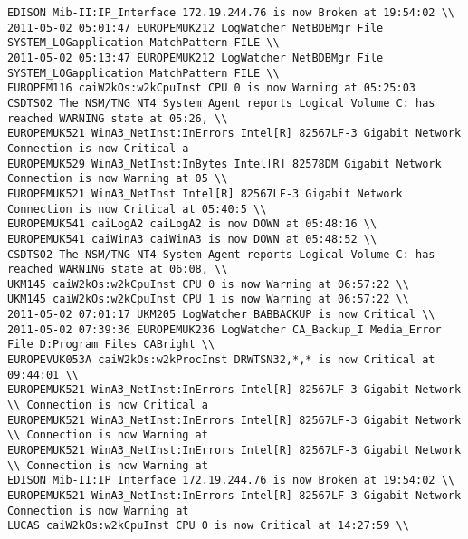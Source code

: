 \begin{lstlisting}
EDISON Mib-II:IP_Interface 172.19.244.76 is now Broken at 19:54:02 \\
2011-05-02 05:01:47 EUROPEMUK212 LogWatcher NetBDBMgr File SYSTEM_LOGapplication MatchPattern FILE \\
2011-05-02 05:13:47 EUROPEMUK212 LogWatcher NetBDBMgr File SYSTEM_LOGapplication MatchPattern FILE \\
EUROPEM116 caiW2kOs:w2kCpuInst CPU 0 is now Warning at 05:25:03
CSDTS02 The NSM/TNG NT4 System Agent reports Logical Volume C: has reached WARNING state at 05:26, \\
EUROPEMUK521 WinA3_NetInst:InErrors Intel[R] 82567LF-3 Gigabit Network Connection is now Critical a
EUROPEMUK529 WinA3_NetInst:InBytes Intel[R] 82578DM Gigabit Network Connection is now Warning at 05 \\
EUROPEMUK521 WinA3_NetInst Intel[R] 82567LF-3 Gigabit Network Connection is now Critical at 05:40:5 \\
EUROPEMUK541 caiLogA2 caiLogA2 is now DOWN at 05:48:16 \\
EUROPEMUK541 caiWinA3 caiWinA3 is now DOWN at 05:48:52 \\
CSDTS02 The NSM/TNG NT4 System Agent reports Logical Volume C: has reached WARNING state at 06:08, \\
UKM145 caiW2kOs:w2kCpuInst CPU 0 is now Warning at 06:57:22 \\
UKM145 caiW2kOs:w2kCpuInst CPU 1 is now Warning at 06:57:22 \\
2011-05-02 07:01:17 UKM205 LogWatcher BABBACKUP is now Critical \\
2011-05-02 07:39:36 EUROPEMUK236 LogWatcher CA_Backup_I Media_Error File D:Program Files CABright \\
EUROPEVUK053A caiW2kOs:w2kProcInst DRWTSN32,*,* is now Critical at 09:44:01 \\
EUROPEMUK521 WinA3_NetInst:InErrors Intel[R] 82567LF-3 Gigabit Network \\ Connection is now Critical a
EUROPEMUK521 WinA3_NetInst:InErrors Intel[R] 82567LF-3 Gigabit Network \\ Connection is now Warning at
EUROPEMUK521 WinA3_NetInst:InErrors Intel[R] 82567LF-3 Gigabit Network \\ Connection is now Warning at
EDISON Mib-II:IP_Interface 172.19.244.76 is now Broken at 19:54:02 \\
EUROPEMUK521 WinA3_NetInst:InErrors Intel[R] 82567LF-3 Gigabit Network Connection is now Warning at
LUCAS caiW2kOs:w2kCpuInst CPU 0 is now Critical at 14:27:59 \\

\end{lstlisting}
